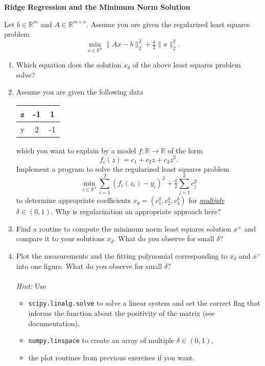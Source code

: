 \textbf{\normalsize Ridge Regression and the Minimum Norm Solution}

Let $b \in \mathbb{R}^m$ and $A \in \mathbb{R}^{m \times n}$.
Assume you are given the regularized least squares problem 
$$
\min\limits_{x \in \mathbb{R}^n} \| Ax-b \|_2^2 + \tfrac{\delta}{2} \|x\|_2^2.
$$
\begin{enumerate}
	\item Which equation does the solution $x_\delta$ of the above least squares problem solve?
	\item Assume you are given the following data
	\begin{center}
		\begin{tabular}{l|cc}
			z&-1&1\\
			\hline
			y&2&-1
		\end{tabular}
	\end{center}
	which you want to explain by a model $f:\mathbb{R} \to \mathbb{R}$ of the form 
	$$f_c(z) = c_1 + c_2z + c_3z^2.$$ 
	Implement a program to solve the regularized least squares problem
	$$
	\min\limits_{c \in \mathbb{R}^3} \sum_{i=1}^2 (f_c(z_i) - y_i)^2 + \tfrac{\delta}{2} \sum_{j=1}^{3} c_j^2
	$$
 to determine appropriate coefficients $x_\delta = (c_1^\delta, c_2^\delta, c_3^\delta)$ for \textit{\underline{multiple}} $\delta \in (0,1)$. Why is regularization an appropriate approach here?
 \item Find a routine to compute the minimum norm least squares solution $x^+$ and compare it to your solutions $x_\delta$. What do you observe for small $\delta$?
	\item Plot the measurements and the fitting polynomial corresponding to $x_\delta$ and $x^+$ into one figure. What do you observe for small $\delta$?\\~\\
	\textit{Hint:} Use 
	\begin{itemize}
		\item \verb|scipy.linalg.solve| to solve a linear system and set the correct flag that informs the function about the positivity of the matrix (see documentation),
		\item \verb|numpy.linspace| to create an array of multiple $\delta \in (0,1)$,
		\item the plot routines from previous exercises if you want.
	\end{itemize}
%	

\end{enumerate} 
